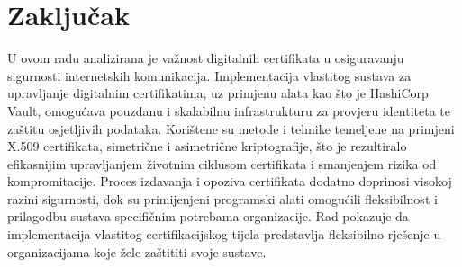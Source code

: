\documentclass[]{foi}
\begin{document}
\chapter{Zaključak}

U ovom radu analizirana je važnost digitalnih certifikata u osiguravanju sigurnosti internetskih komunikacija.
Implementacija vlastitog sustava za upravljanje digitalnim certifikatima, uz primjenu alata kao što je HashiCorp Vault,
omogućava pouzdanu i skalabilnu infrastrukturu za provjeru identiteta te zaštitu osjetljivih podataka.
Korištene su metode i tehnike temeljene na primjeni X.509 certifikata, simetrične i asimetrične kriptografije,
što je rezultiralo efikasnijim upravljanjem životnim ciklusom certifikata i smanjenjem rizika od kompromitacije.
Proces izdavanja i opoziva certifikata dodatno doprinosi visokoj razini sigurnosti, dok su primijenjeni programski
alati omogućili fleksibilnost i prilagodbu sustava specifičnim potrebama organizacije.
Rad pokazuje da implementacija vlastitog certifikacijskog tijela predstavlja fleksibilno
rješenje u organizacijama koje žele zaštititi svoje sustave.

\makebackmatter



\end{document}
